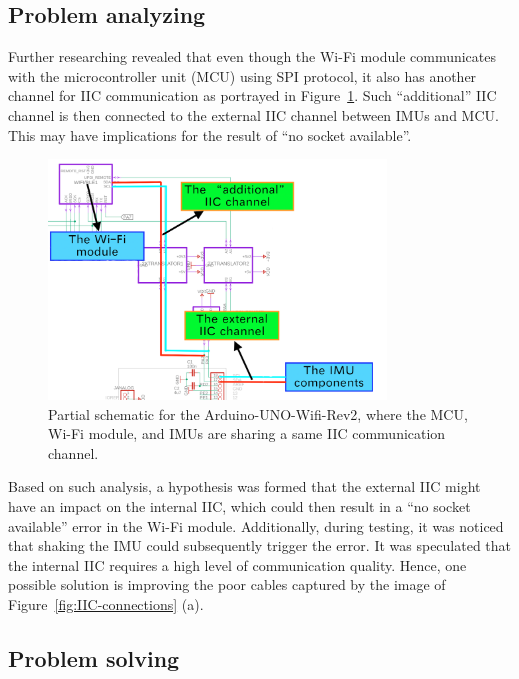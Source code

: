 \subsection{Problem analyzing}
Further researching revealed that even though the Wi-Fi module communicates with the microcontroller unit (MCU) using SPI protocol, it also has another channel for IIC communication as portrayed in  Figure~\ref{fig:IIC-conflict}.
Such ``additional'' IIC channel is then connected to the external IIC channel between IMUs and MCU\@.
This may have implications for the result of ``no socket available''.

\begin{figure}[htbp]
	\centering
	\includegraphics[width=0.8\textwidth]{
		fileForWriting/IIC-conflict}
	\caption[Schematic for the Arduino-UNO-Wifi-Rev2]{Partial schematic for the Arduino-UNO-Wifi-Rev2, where the MCU, Wi-Fi module, and IMUs are sharing a same IIC communication channel.
	}
	\label{fig:IIC-conflict}
\end{figure}



Based on such analysis, a hypothesis was formed that the external IIC might have an impact on the internal IIC, which could then result in a ``no socket available'' error in the Wi-Fi module.
Additionally, during testing, it was noticed that shaking the IMU could subsequently trigger the error.
It was speculated that the internal IIC requires a high level of communication quality.
Hence, one possible solution is improving the poor cables captured by the image of  Figure~\ref{fig:IIC-connections} (a).


\subsection{Problem solving}
